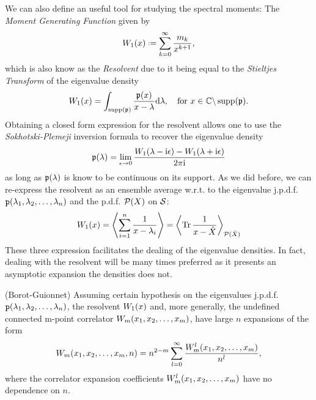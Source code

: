 We can also define an useful tool for studying the spectral moments: The \textit{Moment Generating Function} given by
\begin{equation}
	\W_1(x) \deff \sum_{k=0}^{\infty} \frac{\me_k}{x^{k+1}},
\end{equation} 
which is also know as the \textit{Resolvent} due to it being equal to the \textit{Stieltjes Transform} of the eigenvalue density
\begin{equation}
	W_1(x) = \int_{\operatorname{supp}(\mathfrak{p})} \frac{\mathfrak{p}(x)}{x - \lambda} \mathrm{d} \lambda, \quad \text{for} \ x \in \mathbb{C} \backslash \operatorname{supp}(\mathfrak{p}).
\end{equation}
Obtaining a closed form expression for the resolvent allows one to use the \textit{Sokhotski-Plemeji} inversion formula to recover the eigenvalue density
\begin{equation}
	\mathfrak{p}(\lambda) = \lim_{\epsilon \rightarrow 0} \frac{W_1(\lambda - \mathrm{i} \epsilon) - W_1(\lambda + \mathrm{i} \epsilon)}{2\pi \mathrm{i}}
\end{equation}
as long as $\mathfrak{p}(\lambda)$ is know to be continuous on its support. As we did before, we can re-express the resolvent as an ensemble average w.r.t. to the eigenvalue j.p.d.f. $\mathtt{p}(\lambda_1, \lambda_2, \dots, \lambda_n)$ and the p.d.f. $\mathcal{P}(X)$ on $\mathcal{S}$:
\begin{equation}
	W_1(x) = \left\langle \sum_{i=1}^{n} \frac{1}{x - \lambda_i} \right\rangle =  \left\langle \operatorname{Tr} \frac{1}{x - \hat X} \right\rangle_{\mathcal{P}(\hat X)}
\end{equation}  
These three expression facilitates the dealing of the eigenvalue densities. In fact, dealing with the resolvent will be many times preferred as it presents an asymptotic expansion the densities does not.

\begin{teorema}
	(Borot-Guionnet) Assuming certain hypothesis on the eigenvalues j.p.d.f. $\mathtt{p}(\lambda_1, \lambda_2, \dots, \lambda_n)$, the resolvent $W_1(x)$ and, more generally, the undefined connected m-point correlator $W_m(x_1, x_2, \dots, x_m)$, have large $n$ expansions of the form
	\begin{equation}
		W_m(x_1, x_2, \dots, x_m, n) = n^{2-m} \sum_{l=0}^{\infty} \frac{W^l_m(x_1, x_2, \dots, x_m)}{n^l},
	\end{equation}
	where the correlator expansion coefficients $W^l_m(x_1, x_2, \dots, x_m)$ have no dependence on $n$.
\end{teorema}

